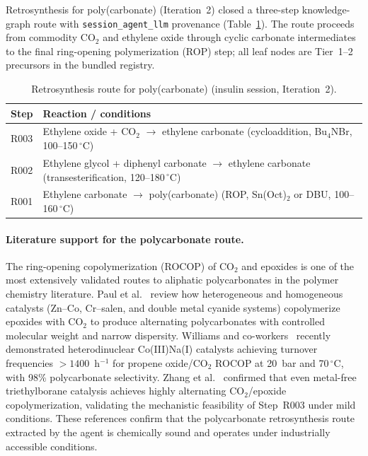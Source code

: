 \documentclass[twocolumn]{fairmeta}
\begin{document}
Retrosynthesis for poly(carbonate) (Iteration~2) closed a three-step knowledge-graph route with \texttt{session\_agent\_llm} provenance (Table~\ref{tab:insulin_retro}).
The route proceeds from commodity CO$_2$ and ethylene oxide through cyclic carbonate intermediates to the final ring-opening polymerization (ROP) step; all leaf nodes are Tier~1--2 precursors in the bundled registry.

\begin{table}[H]
\centering
\caption{Retrosynthesis route for poly(carbonate) (insulin session, Iteration~2).}
\label{tab:insulin_retro}
\scriptsize
\begin{tabularx}{\columnwidth}{lX}
\toprule
Step & Reaction / conditions \\
\midrule
R003 & Ethylene oxide + CO$_2$ $\to$ ethylene carbonate (cycloaddition, Bu$_4$NBr, 100--150\,$^\circ$C) \\
R002 & Ethylene glycol + diphenyl carbonate $\to$ ethylene carbonate (transesterification, 120--180\,$^\circ$C) \\
R001 & Ethylene carbonate $\to$ poly(carbonate) (ROP, Sn(Oct)$_2$ or DBU, 100--160\,$^\circ$C) \\
\bottomrule
\end{tabularx}
\end{table}

\paragraph{Literature support for the polycarbonate route.}
The ring-opening copolymerization (ROCOP) of CO$_2$ and epoxides is one of the most extensively validated routes to aliphatic polycarbonates in the polymer chemistry literature.
Paul et al.~\cite{paul2015rocop} review how heterogeneous and homogeneous catalysts (Zn--Co, Cr--salen, and double metal cyanide systems) copolymerize epoxides with CO$_2$ to produce alternating polycarbonates with controlled molecular weight and narrow dispersity.
Williams and co-workers~\cite{williams2025coiii} recently demonstrated heterodinuclear Co(III)Na(I) catalysts achieving turnover frequencies $>1400$~h$^{-1}$ for propene oxide/CO$_2$ ROCOP at 20~bar and 70\,$^\circ$C, with 98\% polycarbonate selectivity.
Zhang et al.~\cite{zhang2018metalfree} confirmed that even metal-free triethylborane catalysis achieves highly alternating CO$_2$/epoxide copolymerization, validating the mechanistic feasibility of Step~R003 under mild conditions.
These references confirm that the polycarbonate retrosynthesis route extracted by the agent is chemically sound and operates under industrially accessible conditions.
\end{document}
